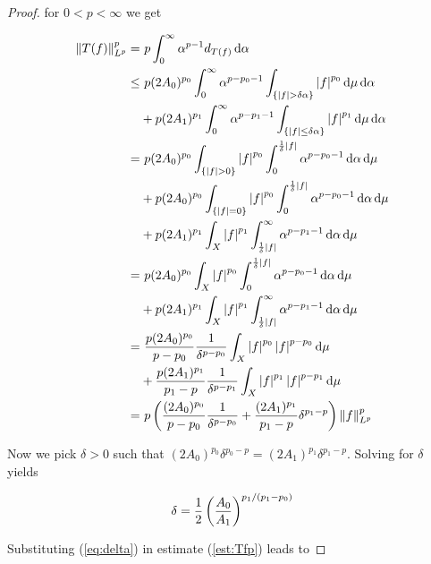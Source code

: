 \begin{proof}
	\noindent for $ 0 < p < \infty$ we get

\begin{equation}
	\begin{aligned}
		\norm[0]{T(f)}^p_{L^p} = &~p\int_0^{\infty}\alpha^{p-1}d_{T(f)} \d\alpha\\
		\leq &~p(2A_0)^{p_0}\int_0^{\infty}\alpha^{p-p_0-1} \int_{\cbr[0]{\abs[0]{f} > \delta \alpha}} \abs[0]{ f}^{p_0}\d\mu \d\alpha\\
		&+ p(2A_1)^{p_1}\int_0^{\infty}\alpha^{p-p_1-1} \int_{\cbr[0]{\abs[0]{ f } \leq \delta \alpha}} \abs[0]{ f}^{p_1}\d\mu \d\alpha\\
		= &~p(2A_0)^{p_0}\int_{\cbr[0]{\abs[0]{ f } > 0}} \abs[0]{ f }^{p_0} \int_0^{\frac{1}{\delta}\abs[0]{ f}}\alpha^{p-p_0-1} \d\alpha \d\mu\\
		&+ p(2A_0)^{p_0}\int_{\cbr[0]{\abs[0]{f} = 0}} \abs[0]{ f }^{p_0} \int_0^{\frac{1}{\delta}\abs[0]{ f}}\alpha^{p-p_0-1} \d\alpha \d\mu\\
		&+ p(2A_1)^{p_1}\int_X \abs[0]{ f}^{p_1} \int_{\frac{1}{\delta}\abs[0]{ f}}^{\infty}\alpha^{p - p_1 - 1} \d\alpha \d\mu\\
		= &~p(2A_0)^{p_0}\int_X \abs[0]{ f }^{p_0} \int_0^{\frac{1}{\delta}\abs[0]{ f}}\alpha^{p-p_0-1} \d\alpha \d\mu\\
		&+ p(2A_1)^{p_1}\int_X \abs[0]{ f}^{p_1} \int_{\frac{1}{\delta}\abs[0]{ f}}^{\infty}\alpha^{p - p_1 - 1} \d\alpha \d\mu\\
		=&~\frac{p(2A_0)^{p_0}}{p-p_0}\frac{1}{\delta^{p-p_0}}\int_X \abs[0]{f}^{p_0}\abs[0]{ f }^{p-p_0}  \d\mu\\
		&+ \frac{p(2A_1)^{p_1}}{p_1-p}\frac{1}{\delta^{p-p_1}}\int_X \abs[0]{ f}^{p_1} \abs[0]{ f}^{p-p_1}\d\mu\\
		= &~p\del{ \frac{(2A_0)^{p_0}}{p - p_0}\frac{1}{\delta^{p - p_0}} + \frac{(2A_1)^{p_1}}{p_1 - p}\delta^{p_1 - p}}\norm[0]{f}_{L^p}^p
	\end{aligned}
	\label{est:Tfp}
\end{equation}

		Now we pick $\delta > 0$ such that $(2A_0)^{p_0}\delta^{p_0 - p} = (2A_1)^{p_1}\delta^{p_1 - p}$. Solving for $\delta$ yields 

		\begin{equation}
			\delta = \frac{1}{2} \del{ \frac{A_0}{A_1}}^{p_1/(p_1 - p_0)}
			\label{eq:delta}
		\end{equation}

		Substituting (\ref{eq:delta}) in estimate (\ref{est:Tfp}) leads to


\end{proof}
